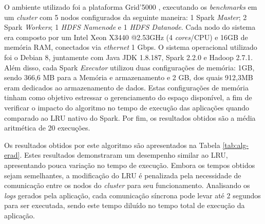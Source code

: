 O ambiente utilizado foi a plataforma Grid'5000 \cite{bolze2006grid}, executando os \textit{benchmarks} em um \textit{cluster} com 5 nodos configurados da seguinte maneira: 1 Spark \textit{Master}; 2 Spark \textit{Workers}; 1 \textit{HDFS Namenode} e 1 \textit{HDFS Datanode}. Cada nodo do sistema era composto por um Intel Xeon X3440 @2.53GHz (4 \textit{cores}/CPU) e 16GB de memória RAM, conectados via \textit{ethernet} 1 Gbps. O sistema operacional utilizado foi o Debian 8, juntamente com Java JDK 1.8.187, Spark 2.2.0 e Hadoop 2.7.1. Além disso, cada Spark \textit{Executor} utilizou duas configurações de memória: 1GB, sendo 366,6 MB para a Memória e armazenamento e 2 GB, dos quais 912,3MB eram dedicados ao armazenamento de dados. Estas configurações de memória tinham como objetivo estressar o gerenciamento do espaço disponível, a fim de verificar o impacto do algoritmo no tempo de execução das aplicações quando comparado ao LRU nativo do Spark. Por fim, os resultados obtidos são a média aritmética de 20 execuções.

Os resultados obtidos por este algoritmo são apresentados na Tabela \ref{tab:alg-erad}. Estes resultados demonstraram um desempenho similar ao LRU, apresentando pouca variação no tempo de execução. Embora os tempos obtidos sejam semelhantes, a modificação do LRU é penalizada pela necessidade de comunicação entre os nodos do \textit{cluster} para seu funcionamento. Analisando os \textit{logs} gerados pela aplicação, cada comunicação síncrona pode levar até 2 segundos para ser executada, sendo este tempo diluído no tempo total de execução da aplicação.

